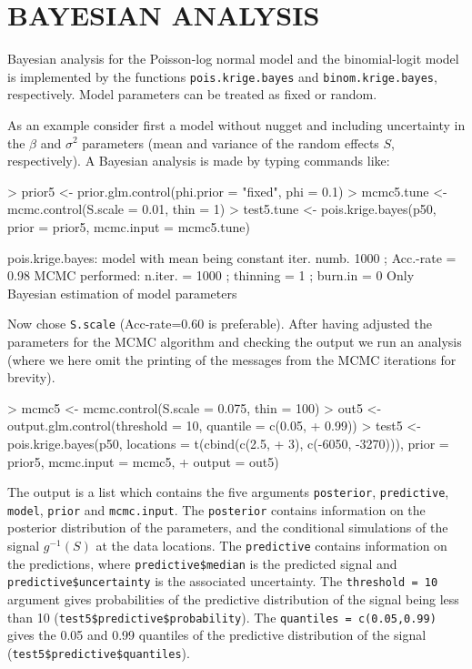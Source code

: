 \documentclass[12pt,a4paper]{article}
\newcommand{\code}[1]{\texttt{\small #1}}
\let\command=\code
\begin{document}
\section{BAYESIAN ANALYSIS}

Bayesian analysis for the Poisson-log normal model and the binomial-logit model is implemented by the functions 
\command{pois.krige.bayes} and \command{binom.krige.bayes}, respectively.
Model parameters can be treated as fixed or random.        

As an example consider first a model without nugget and including uncertainty in the $\beta$ and $\sigma^2$ parameters (mean and variance of the random effects $S$, respectively). 
A Bayesian analysis is made by typing commands like: 
\begin{Schunk}
\begin{Sinput}
> prior5 <- prior.glm.control(phi.prior = "fixed", phi = 0.1)
> mcmc5.tune <- mcmc.control(S.scale = 0.01, thin = 1)
> test5.tune <- pois.krige.bayes(p50, prior = prior5, mcmc.input = mcmc5.tune)
\end{Sinput}
\begin{Soutput}
pois.krige.bayes: model with mean being constant
iter. numb. 1000 ; Acc.-rate = 0.98 
MCMC performed: n.iter. =  1000 ; thinning =  1 ; burn.in =  0 
Only Bayesian estimation of model parameters 
\end{Soutput}
\end{Schunk}

Now chose \code{S.scale} (Acc-rate=0.60 is preferable).  
After having adjusted the parameters for the MCMC algorithm and
checking the output we run an analysis (where we here omit the
printing of the messages from the MCMC iterations for brevity).
\begin{Schunk}
\begin{Sinput}
> mcmc5 <- mcmc.control(S.scale = 0.075, thin = 100)
> out5 <- output.glm.control(threshold = 10, quantile = c(0.05, 
+     0.99))
> test5 <- pois.krige.bayes(p50, locations = t(cbind(c(2.5, 
+     3), c(-6050, -3270))), prior = prior5, mcmc.input = mcmc5, 
+     output = out5)
\end{Sinput}
\end{Schunk}

The output is a list which contains the five arguments \code{posterior}, \code{predictive}, \code{model}, \code{prior} and \code{mcmc.input}. 
The \code{posterior} contains information
on the posterior distribution of the parameters, and the conditional simulations of the signal 
$g^{-1}(S)$ at the data locations. 
The \code{predictive} contains information on the predictions, where 
\code{predictive\$median} is the predicted signal and \code{predictive\$uncertainty} is the associated uncertainty.
The \code{threshold = 10} argument gives probabilities of the predictive distribution of the signal being less 
than 10 (\code{test5\$predictive\$probability}).
The \code{quantiles = c(0.05,0.99)} gives the 0.05 and 0.99 quantiles of the predictive distribution of the signal 
(\code{test5\$predictive\$quantiles}).
\end{document}
